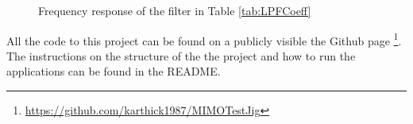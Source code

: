 \begin{figure}[H]
    \centering
    \qquad
    \caption{Frequency response of the filter in Table \ref{tab:LPFCoeff}}%
    \label{fig:SINRLPFResp}%
\end{figure}

All the code to this project can be found on a publicly visible the Github page \footnote{\url{https://github.com/karthick1987/MIMOTestJig}}. The instructions on the structure of the the project and how to run the applications can be found in the README.
